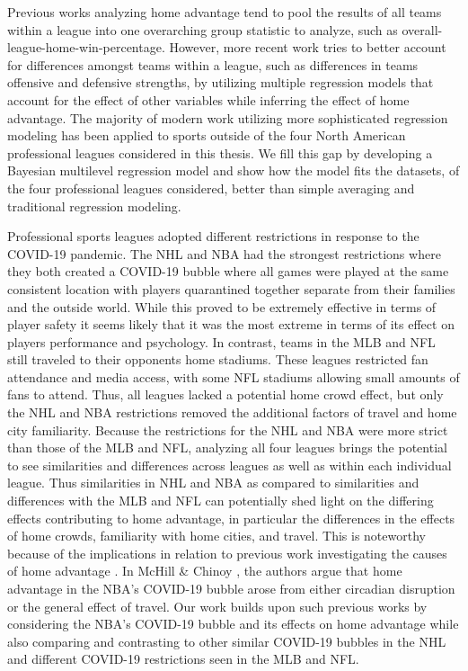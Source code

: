 Previous works analyzing home advantage tend to pool the results of all teams within a league into one overarching group statistic to analyze, such as overall-league-home-win-percentage. However, more recent work tries to better account for differences amongst teams within a league, such as differences in teams offensive and defensive strengths, by utilizing multiple regression models that account for the effect of other variables while inferring the effect of home advantage. The majority of modern work utilizing more sophisticated regression modeling has been applied to sports outside of the four North American professional leagues considered in this thesis. We fill this gap by developing a Bayesian multilevel regression model and show how the model fits the datasets, of the four professional leagues considered, better than simple averaging and traditional regression modeling.

Professional sports leagues adopted different restrictions in response to the COVID-19 pandemic. The NHL and NBA had the strongest restrictions where they both created a COVID-19 bubble where all games were played at the same consistent location with players quarantined together separate from their families and the outside world. While this proved to be extremely effective in terms of player safety \cite{nhl2020} \cite{usatoday2020} it seems likely that it was the most extreme in terms of its effect on players performance and psychology. In contrast, teams in the MLB and NFL still traveled to their opponents home stadiums. These leagues restricted fan attendance and media access, with some NFL stadiums allowing small amounts of fans to attend. Thus, all leagues lacked a potential home crowd effect, but only the NHL and NBA restrictions removed the additional factors of travel and home city familiarity. Because the restrictions for the NHL and NBA were more strict than those of the MLB and NFL, analyzing all four leagues brings the potential to see similarities and differences across leagues as well as within each individual league. Thus similarities in NHL and NBA as compared to similarities and differences with the MLB and NFL can potentially shed light on the differing effects contributing to home advantage, in particular the differences in the effects of home crowds, familiarity with home cities, and travel. This is noteworthy because of the implications in relation to previous work investigating the causes of home advantage  \cite{Unkelbach2010} \cite{Buraimo2010} \cite{Courneya1992} \cite{Carron2005} \cite{McHill2020} \cite{Garicano2005} \cite{Moskowitz2012}. In McHill \& Chinoy \cite{McHill2020}, the authors argue that home advantage in the NBA's COVID-19 bubble arose from either circadian disruption or the general effect of travel. Our work builds upon such previous works by considering the NBA's COVID-19 bubble and its effects on home advantage while also comparing and contrasting to other similar COVID-19 bubbles in the NHL and different COVID-19 restrictions seen in the MLB and NFL.

